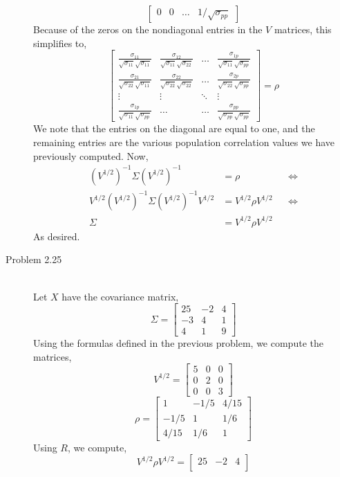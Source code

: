 \documentclass[letterpaper,10pt]{article}
\begin{document}
\begin{description}
\[\begin{bmatrix}
0 & 0 & \ldots & 1/\sqrt{\sigma_{pp}}
\end{bmatrix}\]
Because of the zeros on the nondiagonal entries in the $V$ matrices, this simplifies to,
\[\begin{bmatrix}
\frac{\sigma_{11}}{\sqrt{\sigma_{11}}\sqrt{\sigma_{11}}} & \frac{\sigma_{12}}{\sqrt{\sigma_{11}}\sqrt{\sigma_{22}}} & \ldots & \frac{\sigma_{1p}}{\sqrt{\sigma_{11}}\sqrt{\sigma_{pp}}}\\
\frac{\sigma_{21}}{\sqrt{\sigma_{22}}\sqrt{\sigma_{11}}} & \frac{\sigma_{22}}{\sqrt{\sigma_{22}}\sqrt{\sigma_{22}}} & \ldots & \frac{\sigma_{2p}}{\sqrt{\sigma_{22}}\sqrt{\sigma_{pp}}}\\
\vdots & \vdots & \ddots & \vdots\\
\frac{\sigma_{1p}}{\sqrt{\sigma_{11}}\sqrt{\sigma_{pp}}} & \ldots & \ldots & \frac{\sigma_{pp}}{\sqrt{\sigma_{pp}}\sqrt{\sigma_{pp}}}
\end{bmatrix}=\rho\]
We note that the entries on the diagonal are equal to one, and the remaining entries are the various population correlation values we have previously computed. Now,
\begin{align*}
(V^{1/2})^{-1}\Sigma(V^{1/2})^{-1}&=\rho && \Leftrightarrow\\
V^{1/2}(V^{1/2})^{-1}\Sigma(V^{1/2})^{-1}V^{1/2} &= V^{1/2}\rho V^{1/2} && \Leftrightarrow\\
\Sigma &= V^{1/2}\rho V^{1/2}
\end{align*}
As desired.
\item[Problem 2.25]\hfill\\
Let $X$ have the covariance matrix,
\[\Sigma=\begin{bmatrix}
25 & -2 & 4\\
-3 & 4 & 1\\
4 & 1 & 9
\end{bmatrix} \]
Using the formulas defined in the previous problem, we compute the matrices,
\[V^{1/2}=\begin{bmatrix}
5 & 0 & 0\\
0 & 2 & 0\\
0 & 0 & 3
\end{bmatrix} \]
\[\rho=\begin{bmatrix}
1 & -1/5 & 4/15\\
-1/5 & 1 & 1/6\\
4/15 & 1/6 & 1
\end{bmatrix} \]
Using $R$, we compute,
\[V^{1/2}\rho V^{1/2} = \begin{bmatrix}
25 & -2 & 4\\

\end{bmatrix}\]
\end{description}
\end{document}

